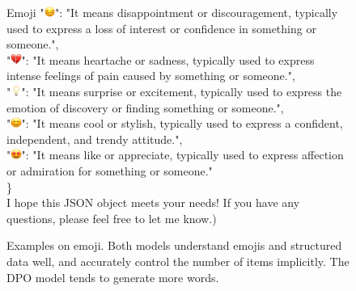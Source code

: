\begin{figure}[]
{\begin{AIbox}{Emoji}
{{"\includegraphics[height=10pt]{Fig/pensive-face_1f614.png}": "It means disappointment or discouragement, typically used to express a loss of interest or confidence in something or someone.", \\
"\includegraphics[height=10pt]{Fig/broken-heart_1f494.png}": "It means heartache or sadness, typically used to express intense feelings of pain caused by something or someone.", \\
"\includegraphics[height=10pt]{Fig/light-bulb_1f4a1.png}": "It means surprise or excitement, typically used to express the emotion of discovery or finding something or someone.",\\
"\includegraphics[height=10pt]{Fig/smiling-face-with-smiling-eyes_1f60a.png}": "It means cool or stylish, typically used to express a confident, independent, and trendy attitude.",\\
"\includegraphics[height=10pt]{Fig/smiling-face-with-heart-eyes_1f60d.png}": "It means like or appreciate, typically used to express affection or admiration for something or someone."\\
\} \\
I hope this JSON object meets your needs! If you have any questions, please feel free to let me know.})
}
\hspace{0.01\linewidth}
\end{AIbox}
}
\caption{Examples on emoji. Both models understand emojis and structured data well, and accurately control the number of items implicitly. The DPO model tends to generate more words. }
\label{fig:emoji}
\end{figure}
